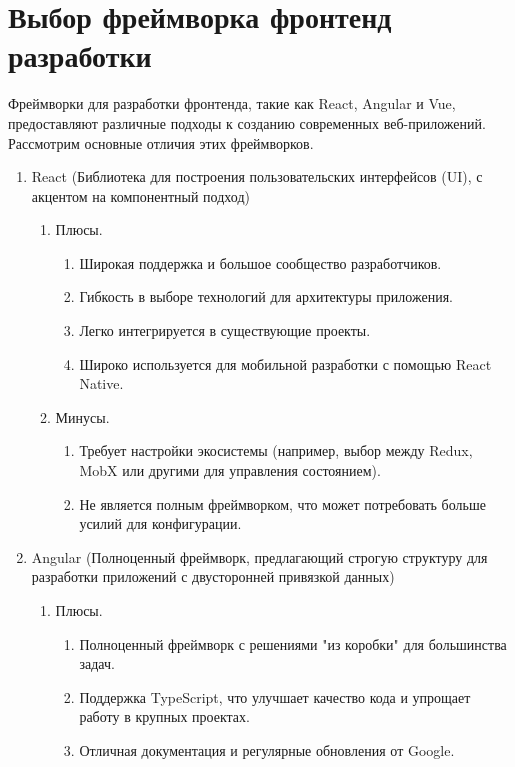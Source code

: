 \section{Выбор фреймворка фронтенд разработки}

Фреймворки для разработки фронтенда, такие как React, Angular и Vue, предоставляют различные подходы к созданию современных веб-приложений. Рассмотрим основные отличия этих фреймворков.

\begin{enumerate}
	\item React (Библиотека для построения пользовательских интерфейсов (UI), с акцентом на компонентный подход)
	\begin{enumerate}
		\item Плюсы.
		\begin{enumerate}
			\item Широкая поддержка и большое сообщество разработчиков.
			\item Гибкость в выборе технологий для архитектуры приложения.
			\item Легко интегрируется в существующие проекты.
			\item Широко используется для мобильной разработки с помощью React Native.
		\end{enumerate}

		\item Минусы.
		\begin{enumerate}
			\item Требует настройки экосистемы (например, выбор между Redux, MobX или другими для управления состоянием).
			\item Не является полным фреймворком, что может потребовать больше усилий для конфигурации.
		\end{enumerate}
	\end{enumerate}

	\item Angular (Полноценный фреймворк, предлагающий строгую структуру для разработки приложений с двусторонней привязкой данных)
	\begin{enumerate}
		\item Плюсы.
		\begin{enumerate}
			\item Полноценный фреймворк с решениями "из коробки" для большинства задач.
			\item Поддержка TypeScript, что улучшает качество кода и упрощает работу в крупных проектах.
			\item Отличная документация и регулярные обновления от Google.
		\end{enumerate}


\end{enumerate}
\end{enumerate}

